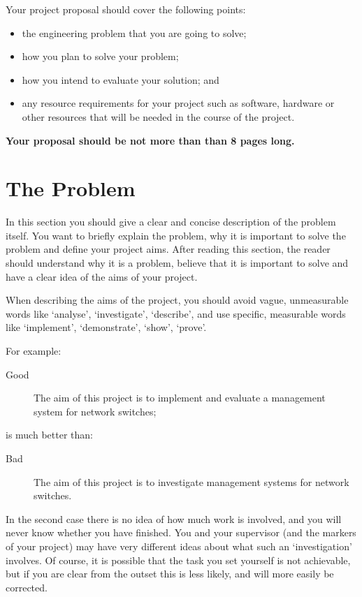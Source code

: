 \documentclass[11pt, a4paper, twoside, openright]{article}
\begin{document}
Your project proposal should cover the following points:

\begin{itemize}
	\item the engineering problem that you are going to solve;
	\item how you plan to solve your problem;
	\item how you intend to evaluate your solution; and
	\item any resource requirements for your project such as software,
	hardware or other resources that will be needed in the course of the project.
\end{itemize}

\textbf{Your proposal should be not more than than 8 pages long.} 

\section{The Problem}

In this section you should give a clear and concise description of the problem
itself. You want to briefly explain the problem, why it is important
to solve the problem and define your project aims. After reading this
section, the reader should understand why it is a problem, believe
that it is important to solve and have a clear idea of the aims of
your project.

When describing the aims of the project, you should avoid vague,
unmeasurable words like `analyse', `investigate', `describe', and use
specific, measurable words like `implement', `demonstrate', `show',
`prove'.

For example:

\begin{description}
	\item[Good] The aim of this project is to implement and evaluate a management system for network switches;
\end{description}
is much better than:
\begin{description}
	\item[Bad] The aim of this project is to investigate management
	systems for network switches.
\end{description}

In the second case there is no idea of how much work is involved, and
you will never know whether you have finished. You and your supervisor (and the markers of your project) may have very different ideas about what such an `investigation' involves. Of course, it is possible that the task you set yourself is not achievable, but if you are clear from the outset this is less likely, and will more easily be corrected.
\end{document}
